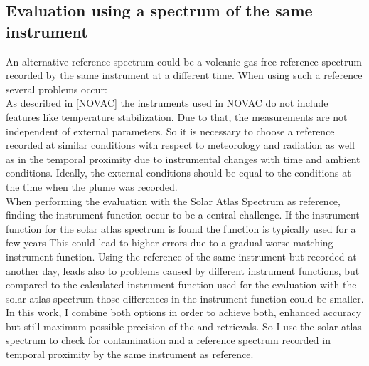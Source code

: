 %
\subsection*{Evaluation using a spectrum of the same instrument}
An alternative reference spectrum could be a volcanic-gas-free reference
spectrum recorded by the same instrument at a different time. When using such a reference several problems occur:\\
As described in \cref{NOVAC} the instruments used in NOVAC do not include features like temperature stabilization. Due to that, the measurements are not independent of external parameters. 
So it is necessary to choose a reference recorded at similar conditions with respect to meteorology and radiation as well as in the temporal proximity due to instrumental changes with time and ambient conditions. Ideally, the external conditions should be equal to the conditions at the time when the plume was recorded.\\
%
When performing the evaluation with the Solar Atlas Spectrum as reference, finding the instrument function occur to be a central challenge. If the instrument function for the solar atlas spectrum is found the function is typically used for a few years This could lead to higher errors due to a gradual worse matching instrument function.
Using the reference of the same instrument but recorded at another day, leads also to problems caused by different instrument functions, but compared to the calculated instrument function used for the evaluation with the solar atlas spectrum those differences in the instrument function could be smaller.
\\
In this work, I combine both options in order to
achieve both, enhanced accuracy but still maximum possible precision of
the  and  retrievals. So I use the solar atlas spectrum to check for 
contamination and a reference spectrum recorded in temporal proximity by the same instrument as reference.\\

